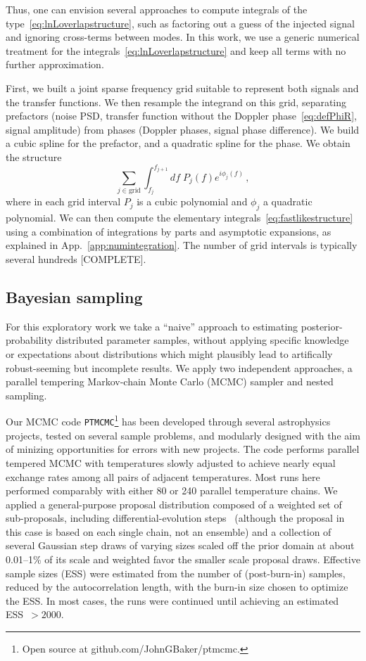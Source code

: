 \documentclass[aps,showpacs,twocolumn,prd,superscriptaddress,nofootinbib]{revtex4-1}
\newcommand{\be}{\begin{equation}}
\newcommand{\ee}{\end{equation}}
\newcommand{\SM}[1]{{\color{Blue} #1}}
\begin{document}
Thus, one can envision several approaches to compute integrals of the type~\eqref{eq:lnLoverlapstructure}, such as factoring out a guess of the injected signal~\cite{} and ignoring cross-terms between modes. In this work, we use a generic numerical treatment for the integrals~\eqref{eq:lnLoverlapstructure} and keep all terms with no further approximation.

First, we built a joint sparse frequency grid suitable to represent both signals and the transfer functions. We then resample the integrand on this grid, separating prefactors (noise PSD, transfer function without the Doppler phase~\eqref{eq:defPhiR}, signal amplitude) from phases (Doppler phases, signal phase difference). We build a cubic spline for the prefactor, and a quadratic spline for the phase. We obtain the structure
\be\label{eq:fastlikestructure}
	\sum_{j \in \mathrm{grid}} \int_{f_{j}}^{f_{j+1}} df \; P_{j} (f) e^{i \phi_{j} (f)} \,,
\ee
where in each grid interval $P_{j}$ is a cubic polynomial and $\phi_{j}$ a quadratic polynomial. We can then compute the elementary integrals~\eqref{eq:fastlikestructure} using a combination of integrations by parts and asymptotic expansions, as explained in App.~\ref{app:numintegration}. The number of grid intervals is typically several hundreds \SM{[COMPLETE]}.



\subsection{Bayesian sampling}
\label{sec:samplers}

For this exploratory work we take a ``naive'' approach to  estimating posterior-probability distributed parameter samples, without applying specific knowledge or expectations about distributions which might plausibly lead to artifically robust-seeming but incomplete results.  We apply two independent approaches, a parallel tempering Markov-chain Monte Carlo (MCMC) sampler and nested sampling. 

Our MCMC code \texttt{PTMCMC}\footnote{Open source at github.com/JohnGBaker/ptmcmc.} has been developed through several astrophysics projects, tested on several sample problems, and modularly designed with the aim of minizing opportunities for errors with new projects. The code performs parallel tempered MCMC\cite{Swendsen+1986,Littenberg2009} with temperatures slowly adjusted to achieve nearly equal exchange rates among all pairs of adjacent temperatures.  Most runs here performed comparably with either 80 or 240 parallel temperature chains.
We applied a general-purpose proposal distribution composed of a weighted set of sub-proposals, including differential-evolution steps~\cite{Vrugt+2008} (although the proposal in this case is based on each single chain, not an ensemble) and a collection of several Gaussian step draws of varying sizes scaled off the prior domain at about 0.01--1\% of its scale and weighted favor the smaller scale proposal draws.
Effective sample sizes (ESS) were estimated from the number of (post-burn-in) samples, reduced by the autocorrelation length, with the burn-in size chosen to optimize the ESS. In most cases, the runs were continued until achieving an estimated ESS~$>2000$.
  
\end{document}
